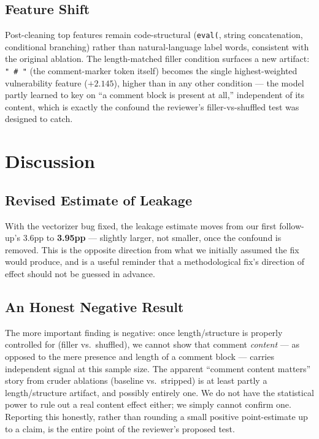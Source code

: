 \documentclass[11pt,a4paper]{article}
\begin{document}
\subsection{Feature Shift}

Post-cleaning top features remain code-structural (\texttt{eval(}, string concatenation, conditional branching) rather than natural-language label words, consistent with the original ablation. The length-matched filler condition surfaces a new artifact: \texttt{" \# "} (the comment-marker token itself) becomes the single highest-weighted vulnerability feature ($+2.145$), higher than in any other condition — the model partly learned to key on ``a comment block is present at all,'' independent of its content, which is exactly the confound the reviewer's filler-vs-shuffled test was designed to catch.

\section{Discussion}

\subsection{Revised Estimate of Leakage}

With the vectorizer bug fixed, the leakage estimate moves from our first follow-up's 3.6pp to \textbf{3.95pp} — slightly larger, not smaller, once the confound is removed. This is the opposite direction from what we initially assumed the fix would produce, and is a useful reminder that a methodological fix's direction of effect should not be guessed in advance.

\subsection{An Honest Negative Result}

The more important finding is negative: once length/structure is properly controlled for (filler vs.\ shuffled), we cannot show that comment \emph{content} — as opposed to the mere presence and length of a comment block — carries independent signal at this sample size. The apparent ``comment content matters'' story from cruder ablations (baseline vs.\ stripped) is at least partly a length/structure artifact, and possibly entirely one. We do not have the statistical power to rule out a real content effect either; we simply cannot confirm one. Reporting this honestly, rather than rounding a small positive point-estimate up to a claim, is the entire point of the reviewer's proposed test.
\end{document}
